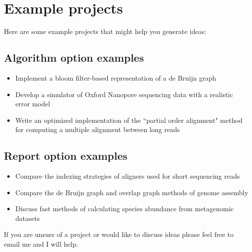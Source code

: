 \documentclass[12pt]{article}
\begin{document}
\section*{Example projects}

Here are some example projects that might help you generate ideas:

\subsection*{Algorithm option examples}

\begin{itemize}
\item Implement a bloom filter-based representation of a de Bruijn graph
\item Develop a simulator of Oxford Nanopore sequencing data with a realistic error model
\item Write an optimized implementation of the ``partial order alignment" method for computing a multiple alignment between long reads
\end{itemize}

\subsection*{Report option examples}

\begin{itemize}
\item Compare the indexing strategies of aligners used for short sequencing reads
\item Compare the de Bruijn graph and overlap graph methods of genome assembly
\item Discuss fast methods of calculating species abundance from metagenomic datasets
\end{itemize}

If you are unsure of a project or would like to discuss ideas please feel free to email me and I will help.
\end{document}
